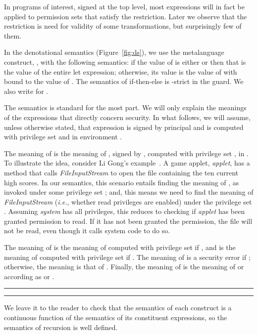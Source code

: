 \documentclass[submission,copyright,creativecommons]{eptcs}
\newcommand{\ie}{{\em i.e.}}
\begin{document}
In programs of interest, signed at the top level, most expressions will in fact be applied to permission sets that satisfy the restriction. 
Later we observe that the restriction is need for validity of some transformations, but surprisingly few of them.  



In the denotational semantics (Figure~\ref{fig:ds}), we use the metalanguage 
construct, , with the following semantics: if the value 
of  is either  or  then that is the value of the entire let 
expression; otherwise, its value is the value of  with  bound to
the value of . 
The semantics of if-then-else is -strict in the guard.
We also write  for 
.

The semantics is standard for the most part. We will only explain the
meanings of the expressions that directly concern security. In what follows,
we will assume, unless otherwise stated, that expression  is signed by 
principal  and is computed with privilege set  and in environment .

The meaning of  is the meaning of , signed by
, computed with privilege set , in . 
To illustrate the idea, consider Li Gong's
example~\cite[Section 3.11.2]{Gong99}. A game applet, \textit{applet},
has a method that calls \textit{FileInputStream} to open the file containing
the ten current high scores. In our semantics, this scenario entails finding
the meaning of , as invoked under some privilege set ; and, this means we need to
find the meaning of \textit{FileInputStream} (\ie, whether read privileges
are enabled) under the privilege set . Assuming 
\textit{system} has all privileges, this reduces to checking if 
\textit{applet} has been granted permission to read. If it has not been granted
the permission, the file will not be read, even though it calls system code
to do so.

The meaning of  is the meaning of
 computed with privilege set  if , and is the 
meaning of  computed with privilege set  if . 
The meaning of  is a security error if ; otherwise, 
the meaning is that of . Finally, the meaning of 
is the meaning of  or  according as  or .



\begin{figure*}
\hrule
\medskip

\medskip
\hrule
\medskip
\caption{Denotational semantics}
\label{fig:ds}
\end{figure*}

We leave it to the reader to check that the semantics of each construct is a
continuous function of the semantics of its constituent expressions,
so the semantics of recursion is well defined. 
\end{document}
